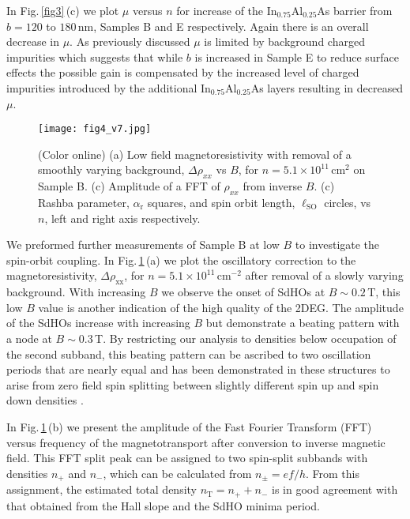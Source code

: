 \documentclass[
floatfix,
aps,
prl,
twocolumn,
superscriptaddress,
amssymb,
 groupaddress,
]{revtex4}
\def\nn{\nonumber}
\def\nt{\nu_{\mathrm{T}}}
\def\nt{n_{\mathrm{T}}}
\def\ar{\alpha_{\mathrm{r}}}
\def\np{n_{+}}
\def\nn{n_{-}}
\def\nt{n_{\mathrm{T}}}
\def\lso{\ell_{\mathrm{SO}}}
\begin{document}
In Fig.\,\ref{fig3}\,(c) we plot $\mu$ versus $n$ for increase of the In$_{0.75}$Al$_{0.25}$As barrier from $b=120$ to $180\,$nm, Samples B and E respectively.
Again there is an overall decrease in $\mu$.
As previously discussed $\mu$ is limited by background charged impurities which suggests that while $b$ is increased in Sample E to reduce surface effects the possible gain is compensated by the increased level of charged impurities introduced by the additional In$_{0.75}$Al$_{0.25}$As layers resulting in decreased $\mu$.



\begin{figure}[t]
\vspace{-0.1 in}
\texttt{[image: fig4\_v7.jpg]}
\vspace{-0.25 in}
\caption{(Color online)
(a) Low field magnetoresistivity with removal of a smoothly varying background, $\Delta \rho_{xx}$ vs $B$, for $n=5.1 \times 10^{11}\,$cm$^{2}$ on Sample B.
(c) Amplitude of a FFT of $\rho_{xx}$ from inverse $B$.
(c) Rashba parameter, $\ar$ squares, and spin orbit length, $\lso$ circles, vs $n$, left and right axis respectively.
}
\vspace{-0.1 in}
\label{fig4}
\end{figure}
We preformed further measurements of Sample B at low $B$ to investigate the spin-orbit coupling.
In Fig.\,\ref{fig4}\,(a) we plot the oscillatory correction to the magnetoresistivity, $\Delta\rho_{\mathrm{xx}}$, for $n=5.1 \times 10^{11}\,$cm$^{-2}$ after removal of a slowly varying background.
With increasing $B$ we observe the onset of SdHOs at $B\sim 0.2\,$T, this low $B$ value is another indication of the high quality of the 2DEG.
The amplitude of the SdHOs increase with increasing $B$ but demonstrate a beating pattern with a node at $B \sim 0.3\,$T.
By restricting our analysis to densities below occupation of the second subband, this beating pattern can be ascribed to two oscillation periods that are nearly equal and has been demonstrated in these structures to arise from zero field spin splitting between slightly different spin up and spin down densities \citep{datta:1990,kim:2010,lee:2011}.


In Fig.\,\ref{fig4}\,(b) we present the amplitude of the Fast Fourier Transform (FFT) versus frequency of the magnetotransport after conversion to inverse magnetic field.
This FFT split peak can be assigned to two spin-split subbands with densities $\np$ and $\nn$, which can be calculated from $n_{\pm}=ef/h$.
From this assignment, the estimated total density $\nt=\np+\nn$ is in good agreement with that obtained from the Hall slope and the SdHO minima period.
\end{document}
